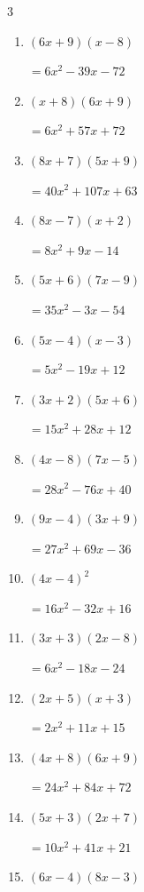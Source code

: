 \begin{multicols}{3}
\begin{enumerate}
        $=18x^{2}-21x-30$

\columnbreak %

  \item $(6x+9)(x-8)$

        $=6x^{2}-39x-72$

  \item $(x+8)(6x+9)$

        $=6x^{2}+57x+72$

  \item $(8x+7)(5x+9)$

        $=40x^{2}+107x+63$

  \item $(8x-7)(x+2)$

        $=8x^{2}+9x-14$

  \item $(5x+6)(7x-9)$

        $=35x^{2}-3x-54$

  \item $(5x-4)(x-3)$

        $=5x^{2}-19x+12$

  \item $(3x+2)(5x+6)$

        $=15x^{2}+28x+12$

  \item $(4x-8)(7x-5)$

        $=28x^{2}-76x+40$

  \item $(9x-4)(3x+9)$

        $=27x^{2}+69x-36$

  \item $(4x-4)^{2}$

        $=16x^{2}-32x+16$

  \item $(3x+3)(2x-8)$

        $=6x^{2}-18x-24$

  \item $(2x+5)(x+3)$

        $=2x^{2}+11x+15$

  \item $(4x+8)(6x+9)$

        $=24x^{2}+84x+72$

  \item $(5x+3)(2x+7)$

        $=10x^{2}+41x+21$

  \item $(6x-4)(8x-3)$


\end{enumerate}
\end{multicols}
